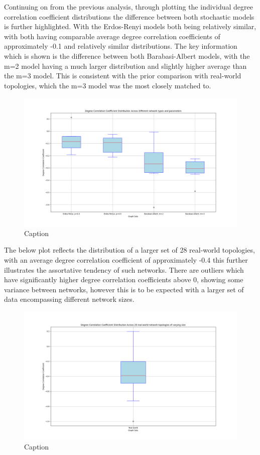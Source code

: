 Continuing on from the previous analysis, through plotting the individual degree correlation coefficient distributions the difference between both stochastic models is further highlighted. With the Erdos-Renyi models both being relatively similar, with both having comparable average degree correlation coefficients of approximately -0.1 and relatively similar distributions. The key information which is shown is the difference between both Barabasi-Albert models, with the m=2 model having a much larger distribution and slightly higher average than the m=3 model. This is consistent with the prior comparison with real-world topologies, which the m=3 model was the most closely matched to. 
\begin{figure}
    \centering
    \includegraphics[width=0.9\linewidth]{images/FINAL-TOPO-COMP/Degree-coeff-distrib/Distrib-by-param.png}
    \caption{Caption}
    \label{fig:enter-label}
\end{figure}

The below plot reflects the distribution of a larger set of 28 real-world topologies, with an average degree correlation coefficient of approximately -0.4 this further illustrates the assortative tendency of such networks. There are outliers which have significantly higher degree correlation coefficients above 0, showing some variance between networks, however this is to be expected with a larger set of data encompassing different network sizes. 

\begin{figure}
    \centering
    \includegraphics[width=0.9\linewidth]{images/FINAL-TOPO-COMP/Degree-coeff-distrib/Distrib-28-real-world.png}
    \caption{Caption}
    \label{fig:enter-label}
\end{figure}

